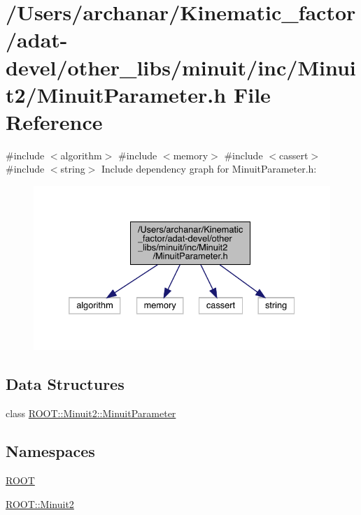 \hypertarget{adat-devel_2other__libs_2minuit_2inc_2Minuit2_2MinuitParameter_8h}{}\section{/\+Users/archanar/\+Kinematic\+\_\+factor/adat-\/devel/other\+\_\+libs/minuit/inc/\+Minuit2/\+Minuit\+Parameter.h File Reference}
\label{adat-devel_2other__libs_2minuit_2inc_2Minuit2_2MinuitParameter_8h}
{\ttfamily \#include $<$algorithm$>$}\newline
{\ttfamily \#include $<$memory$>$}\newline
{\ttfamily \#include $<$cassert$>$}\newline
{\ttfamily \#include $<$string$>$}\newline
Include dependency graph for Minuit\+Parameter.\+h\+:
\nopagebreak
\begin{figure}[H]
\begin{center}
\leavevmode
\includegraphics[width=332pt]{d0/d44/adat-devel_2other__libs_2minuit_2inc_2Minuit2_2MinuitParameter_8h__incl}
\end{center}
\end{figure}
\subsection*{Data Structures}
\begin{DoxyCompactItemize}
\item 
class \mbox{\hyperlink{classROOT_1_1Minuit2_1_1MinuitParameter}{R\+O\+O\+T\+::\+Minuit2\+::\+Minuit\+Parameter}}
\end{DoxyCompactItemize}
\subsection*{Namespaces}
\begin{DoxyCompactItemize}
\item 
 \mbox{\hyperlink{namespaceROOT}{R\+O\+OT}}
\item 
 \mbox{\hyperlink{namespaceROOT_1_1Minuit2}{R\+O\+O\+T\+::\+Minuit2}}
\end{DoxyCompactItemize}
